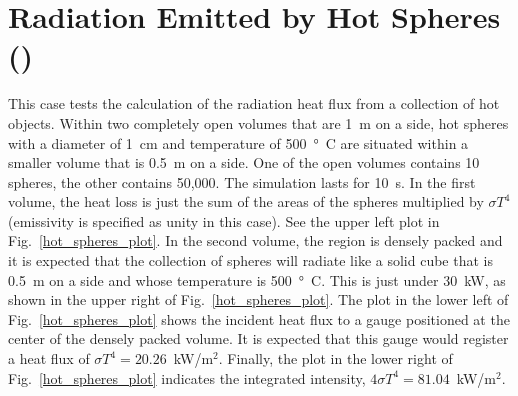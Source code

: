 \documentclass[11pt]{book}
\begin{document}



\section{Radiation Emitted by Hot Spheres (\texorpdfstring{}{hot\_spheres}) }
\label{hot_spheres}

This case tests the calculation of the radiation heat flux from a collection of hot objects. Within two completely open volumes that are 1~m on a side, hot spheres with a diameter of 1~cm and temperature of 500~\si{\degree C} are situated within a smaller volume that is 0.5~m on a side. One of the open volumes contains 10 spheres, the other contains 50,000. The simulation lasts for 10~s. In the first volume, the heat loss is just the sum of the areas of the spheres multiplied by $\sigma T^4$ (emissivity is specified as unity in this case). See the upper left plot in Fig.~\ref{hot_spheres_plot}. In the second volume, the region is densely packed and it is expected that the collection of spheres will radiate like a solid cube  that is 0.5~m on a side and whose temperature is 500~\si{\degree C}. This is just under 30~kW, as shown in the upper right of Fig.~\ref{hot_spheres_plot}. The plot in the lower left of Fig.~\ref{hot_spheres_plot} shows the incident heat flux to a gauge positioned at the center of the densely packed volume.  It is expected that this gauge would register a heat flux of $\sigma T^4=20.26$~kW/m$^2$. Finally, the plot in the lower right of Fig.~\ref{hot_spheres_plot} indicates the integrated intensity, $4 \sigma T^4=81.04$~kW/m$^2$.
\end{document}
